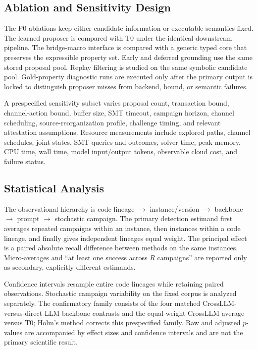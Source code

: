 \documentclass[journal]{IEEEtran}
\theoremstyle{definition}
\begin{document}
\subsection{Ablation and Sensitivity Design}
The P0 ablations keep either candidate information or executable semantics fixed. The learned proposer is compared with T0 under the identical downstream pipeline. The bridge-macro interface is compared with a generic typed core that preserves the expressible property set. Early and deferred grounding use the same stored proposal pool. Replay filtering is studied on the same symbolic candidate pool. Gold-property diagnostic runs are executed only after the primary output is locked to distinguish proposer misses from backend, bound, or semantic failures.

A prespecified sensitivity subset varies proposal count, transaction bound, channel-action bound, buffer size, SMT timeout, campaign horizon, channel scheduling, source-reorganization profile, challenge timing, and relevant attestation assumptions. Resource measurements include explored paths, channel schedules, joint states, SMT queries and outcomes, solver time, peak memory, CPU time, wall time, model input/output tokens, observable cloud cost, and failure status.

\subsection{Statistical Analysis}
The observational hierarchy is code lineage $\rightarrow$ instance/version $\rightarrow$ backbone $\rightarrow$ prompt $\rightarrow$ stochastic campaign. The primary detection estimand first averages repeated campaigns within an instance, then instances within a code lineage, and finally gives independent lineages equal weight. The principal effect is a paired absolute recall difference between methods on the same instances. Micro-averages and ``at least one success across $R$ campaigns'' are reported only as secondary, explicitly different estimands.

Confidence intervals resample entire code lineages while retaining paired observations. Stochastic campaign variability on the fixed corpus is analyzed separately. The confirmatory family consists of the four matched CrossLLM-versus-direct-LLM backbone contrasts and the equal-weight CrossLLM average versus T0; Holm's method corrects this prespecified family. Raw and adjusted $p$-values are accompanied by effect sizes and confidence intervals and are not the primary scientific result.
\end{document}
